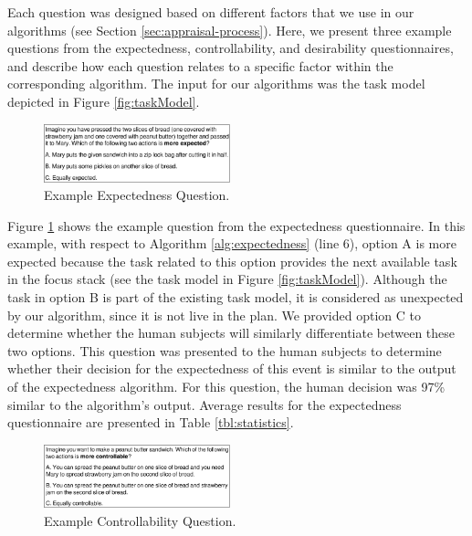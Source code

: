 \documentclass{article}
\begin{document}
Each question was designed based on different factors that we use in our
algorithms (see Section \ref{sec:appraisal-process}). Here, we present three
example questions from the expectedness, controllability, and desirability
questionnaires, and describe how each question relates to a specific factor
within the corresponding algorithm. The input for our algorithms was the task
model depicted in Figure \ref{fig:taskModel}.

\begin{figure}[tbh]
  \vspace{-1mm}
  \centering
  \includegraphics[width=0.48\textwidth]{figure/question-sample-croped.pdf}
  \vspace*{-7mm}
  \caption{{\fontsize{9}{9}\selectfont Example Expectedness Question.}}
  \label{fig:qs1}
  \vspace{-2mm}
\end{figure}

Figure \ref{fig:qs1} shows the example question from the expectedness
questionnaire. In this example, with respect to Algorithm
\ref{alg:expectedness} (line 6), option A is more expected because the task
related to this option provides the next available task in the focus stack (see
the task model in Figure \ref{fig:taskModel}). Although the task in option B is
part of the existing task model, it is considered as unexpected by our
algorithm, since it is not live in the plan. We provided option C to determine
whether the human subjects will similarly differentiate between these two
options. This question was presented to the human subjects to determine whether
their decision for the expectedness of this event is similar to the output of
the expectedness algorithm. For this question, the human decision was 97\%
similar to the algorithm's output. Average results for the expectedness
questionnaire are presented in Table \ref{tbl:statistics}.

\begin{figure}[tbh]
  \vspace{-1mm}
  \centering
  \includegraphics[width=0.48\textwidth]{figure/question-sample2-croped.pdf}
  \vspace*{-7mm}
  \caption{{\fontsize{9}{9}\selectfont Example Controllability Question.}}
  \label{fig:qs2}
  \vspace{-2mm}
\end{figure}
\end{document}
